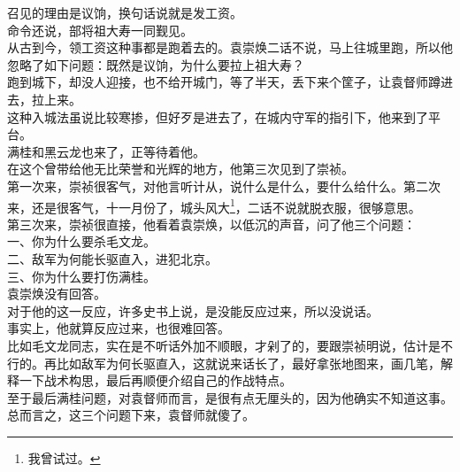 \begin{multicols}{\theparacolNo}
召见的理由是议饷，换句话说就是发工资。\\

命令还说，部将祖大寿一同觐见。\\

从古到今，领工资这种事都是跑着去的。袁崇焕二话不说，马上往城里跑，所以他忽略了如下问题：既然是议饷，为什么要拉上祖大寿？\\

跑到城下，却没人迎接，也不给开城门，等了半天，丢下来个筐子，让袁督师蹲进去，拉上来。\\

这种入城法虽说比较寒掺，但好歹是进去了，在城内守军的指引下，他来到了平台。\\

满桂和黑云龙也来了，正等待着他。\\

在这个曾带给他无比荣誉和光辉的地方，他第三次见到了崇祯。\\

第一次来，崇祯很客气，对他言听计从，说什么是什么，要什么给什么。第二次来，还是很客气，十一月份了，城头风大\footnote{我曾试过。}，二话不说就脱衣服，很够意思。\\

第三次来，崇祯很直接，他看着袁崇焕，以低沉的声音，问了他三个问题：\\

一、你为什么要杀毛文龙。\\

二、敌军为何能长驱直入，进犯北京。\\

三、你为什么要打伤满桂。\\

袁崇焕没有回答。\\

对于他的这一反应，许多史书上说，是没能反应过来，所以没说话。\\

事实上，他就算反应过来，也很难回答。\\

比如毛文龙同志，实在是不听话外加不顺眼，才剁了的，要跟崇祯明说，估计是不行的。再比如敌军为何长驱直入，这就说来话长了，最好拿张地图来，画几笔，解释一下战术构思，最后再顺便介绍自己的作战特点。\\

至于最后满桂问题，对袁督师而言，是很有点无厘头的，因为他确实不知道这事。\\

总而言之，这三个问题下来，袁督师就傻了。\\


\end{multicols}
